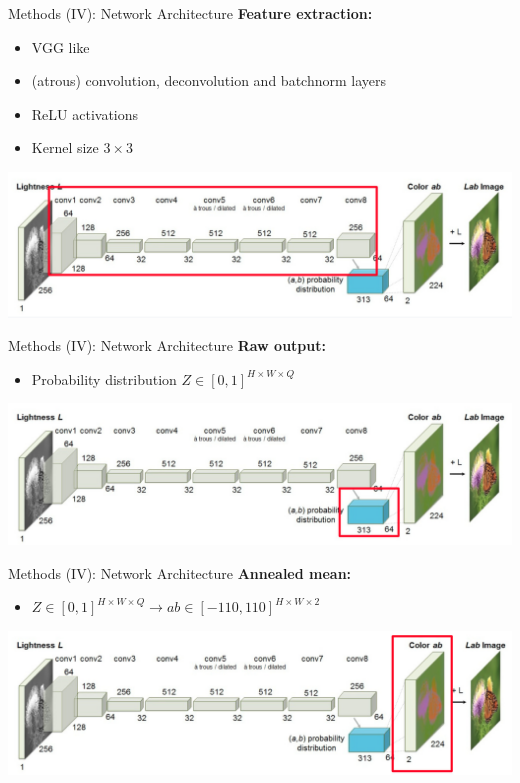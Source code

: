 \documentclass{beamer}
\begin{document}
\begin{frame}{Methods (IV): Network Architecture}
  \textbf{Feature extraction:}
    \begin{itemize}
      \item VGG like
      \item (atrous) convolution, deconvolution and batchnorm layers
      \item ReLU activations
      \item Kernel size $3 \times 3$
    \end{itemize}

  \medskip

  \includegraphics[width=\linewidth]{resources/network2.jpg}
\end{frame}

\begin{frame}{Methods (IV): Network Architecture}
  \textbf{Raw output:}
    \begin{itemize}
      \item Probability distribution $Z \in [0, 1]^{H \times W \times Q}$
    \end{itemize}

  \medskip

  \includegraphics[width=\linewidth]{resources/network3.jpg}
\end{frame}

\begin{frame}{Methods (IV): Network Architecture}
  \textbf{Annealed mean:}
    \begin{itemize}
      \item $Z \in [0, 1]^{H \times W \times Q} \rightarrow ab \in [-110,110]^{H \times W \times 2}$
    \end{itemize}

  \medskip

  \includegraphics[width=\linewidth]{resources/network4.jpg}
\end{frame}
\end{document}
